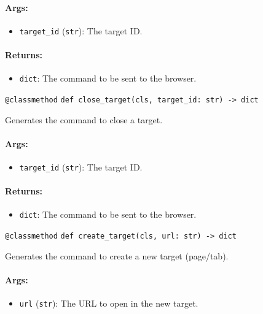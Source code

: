 \documentclass{article}
\begin{document}
\paragraph{Args:}
\begin{itemize}
    \item \texttt{target\_id} (\texttt{str}): The target ID.
\end{itemize}

\paragraph{Returns:}
\begin{itemize}
    \item \texttt{dict}: The command to be sent to the browser.
\end{itemize}

\noindent\texttt{@classmethod}
\noindent\texttt{def close\_target(cls, target\_id: str) -> dict}

\noindent Generates the command to close a target.

\paragraph{Args:}
\begin{itemize}
    \item \texttt{target\_id} (\texttt{str}): The target ID.
\end{itemize}

\paragraph{Returns:}
\begin{itemize}
    \item \texttt{dict}: The command to be sent to the browser.
\end{itemize}

\noindent\texttt{@classmethod}
\noindent\texttt{def create\_target(cls, url: str) -> dict}

\noindent Generates the command to create a new target (page/tab).

\paragraph{Args:}
\begin{itemize}
    \item \texttt{url} (\texttt{str}): The URL to open in the new target.
\end{itemize}
\end{document}
